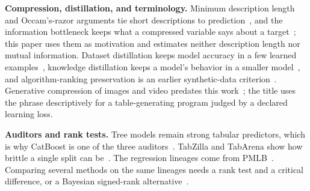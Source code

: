 \documentclass{article}
\begin{document}
\textbf{Compression, distillation, and terminology.} Minimum description length and Occam's-razor arguments tie short descriptions to prediction~\citep{rissanen1978modeling,blumer1987occam}, and the information bottleneck keeps what a compressed variable says about a target~\citep{tishby2000bottleneck}; this paper uses them as motivation and estimates neither description length nor mutual information. Dataset distillation keeps model accuracy in a few learned examples~\citep{wang2018distillation}, knowledge distillation keeps a model's behavior in a smaller model~\citep{hinton2015distilling}, and algorithm-ranking preservation is an earlier synthetic-data criterion~\citep{jordon2018measuring}. Generative compression of images and video predates this work~\citep{santurkar2017generative}; the title uses the phrase descriptively for a table-generating program judged by a declared learning loss.

\textbf{Auditors and rank tests.} Tree models remain strong tabular predictors, which is why CatBoost is one of the three auditors~\citep{grinsztajn2022trees,prokhorenkova2018catboost,shwartz-ziv2022tabular}. TabZilla and TabArena show how brittle a single split can be~\citep{mcelfresh2023tabzilla,erickson2026tabarena}. The regression lineages come from PMLB~\citep{olson2017pmlb,romano2021pmlb}. Comparing several methods on the same lineages needs a rank test and a critical difference, or a Bayesian signed-rank alternative~\citep{demsar2006statistical,benavoli2017time}.



\end{document}
